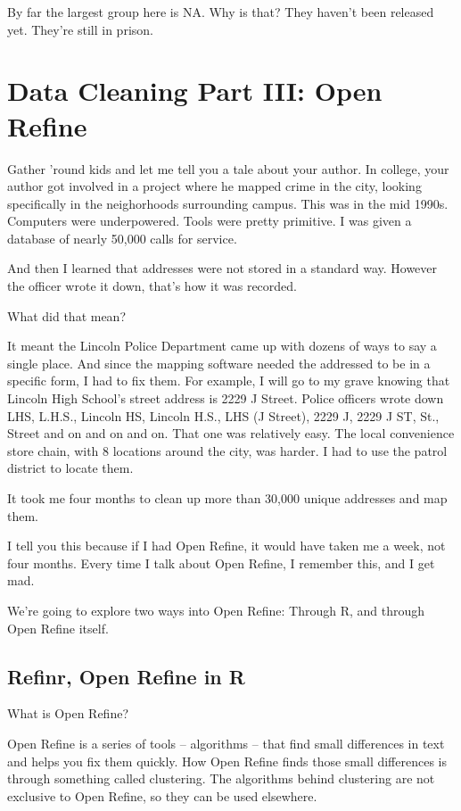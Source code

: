 \documentclass[]{book}
\begin{document}
By far the largest group here is NA. Why is that? They haven't been released yet. They're still in prison.

\hypertarget{data-cleaning-part-iii-open-refine}{%
\chapter{Data Cleaning Part III: Open Refine}\label{data-cleaning-part-iii-open-refine}}

Gather 'round kids and let me tell you a tale about your author. In college, your author got involved in a project where he mapped crime in the city, looking specifically in the neighorhoods surrounding campus. This was in the mid 1990s. Computers were underpowered. Tools were pretty primitive. I was given a database of nearly 50,000 calls for service.

And then I learned that addresses were not stored in a standard way. However the officer wrote it down, that's how it was recorded.

What did that mean?

It meant the Lincoln Police Department came up with dozens of ways to say a single place. And since the mapping software needed the addressed to be in a specific form, I had to fix them. For example, I will go to my grave knowing that Lincoln High School's street address is 2229 J Street. Police officers wrote down LHS, L.H.S., Lincoln HS, Lincoln H.S., LHS (J Street), 2229 J, 2229 J ST, St., Street and on and on and on. That one was relatively easy. The local convenience store chain, with 8 locations around the city, was harder. I had to use the patrol district to locate them.

It took me four months to clean up more than 30,000 unique addresses and map them.

I tell you this because if I had Open Refine, it would have taken me a week, not four months.
Every time I talk about Open Refine, I remember this, and I get mad.

We're going to explore two ways into Open Refine: Through R, and through Open Refine itself.

\hypertarget{refinr-open-refine-in-r}{%
\section{Refinr, Open Refine in R}\label{refinr-open-refine-in-r}}

What is Open Refine?

Open Refine is a series of tools -- algorithms -- that find small differences in text and helps you fix them quickly. How Open Refine finds those small differences is through something called clustering. The algorithms behind clustering are not exclusive to Open Refine, so they can be used elsewhere.
\end{document}
